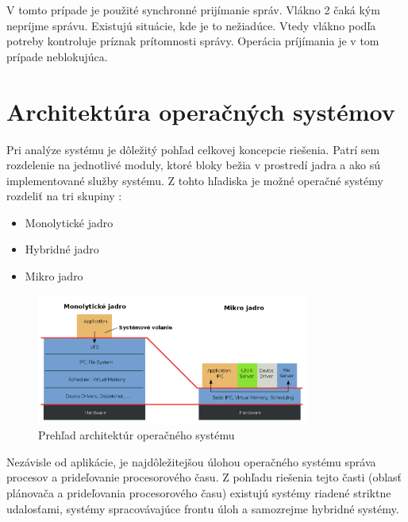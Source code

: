 V tomto prípade je použité synchronné prijímanie správ. Vlákno 2 čaká kým nepríjme správu. Existujú situácie, kde je to nežiadúce. Vtedy vlákno podľa potreby kontroluje príznak prítomnosti správy. Operácia príjímania je v tom prípade neblokujúca.

\newpage
\section{Architektúra operačných systémov}

Pri analýze systému je dôležitý pohľad celkovej koncepcie riešenia. Patrí sem rozdelenie na jednotlivé moduly, ktoré bloky bežia v prostredí jadra a ako sú implementované služby systému. Z tohto hľadiska je možné operačné systémy rozdeliť na tri skupiny :
\begin{itemize}
	\item Monolytické jadro
	\item Hybridné jadro
	\item Mikro jadro
\end{itemize}


\begin{figure}[htbp]
\begin{center}
\begin{minipage}{1.1\linewidth}
\begin{center}
\includegraphics[width=0.8\textwidth]{images/os-structure_01.png}
\caption{Prehľad architektúr operačného systému}
\label{obr1}
\end{center}
\end{minipage}
\end{center}
\end{figure}


Nezávisle od aplikácie, je najdôležitejšou úlohou operačného systému správa procesov a prideľovanie procesorového času. Z pohľadu riešenia tejto časti (oblasť plánovača a prideľovania procesorového času) existujú systémy riadené striktne udalosťami, systémy spracovávajúce frontu úloh a samozrejme hybridné systémy. 

